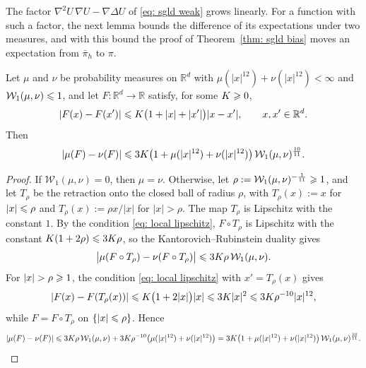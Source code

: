 The factor $\nabla^2 U\, \nabla U - \nabla \Delta U$ of \eqref{eq: sgld weak} grows linearly. For a function with such a factor, the next lemma bounds the difference of its expectations under two measures, and with this bound the proof of Theorem~\ref{thm: sgld bias} moves an expectation from $\bar\pi_h$ to $\pi$.

\begin{lemma}
\label{lem: local lipschitz}
    Let $\mu$ and $\nu$ be probability measures on $\mathbb R^d$ with $\mu(|x|^{12}) + \nu(|x|^{12}) < \infty$ and $\mathcal W_1(\mu, \nu) \leqslant 1$, and let $F : \mathbb R^d \to \mathbb R$ satisfy, for some $K \geqslant 0$,
    \begin{equation}
        |F(x) - F(x')| \leqslant K \bigl( 1 + |x| + |x'| \bigr) |x - x'| , \qquad x, x' \in \mathbb R^d .
        \label{eq: local lipschitz}
    \end{equation}
    Then
    \begin{equation*}
        |\mu(F) - \nu(F)| \leqslant 3 K \bigl( 1 + \mu(|x|^{12}) + \nu(|x|^{12}) \bigr)\, \mathcal W_1(\mu, \nu)^{\frac{10}{11}} .
    \end{equation*}
\end{lemma}

\begin{proof}
    If $\mathcal W_1(\mu,\nu) = 0$, then $\mu = \nu$. Otherwise, let $\rho := \mathcal W_1(\mu,\nu)^{-\frac1{11}} \geqslant 1$, and let $T_\rho$ be the retraction onto the closed ball of radius $\rho$, with $T_\rho(x) := x$ for $|x| \leqslant \rho$ and $T_\rho(x) := \rho x / |x|$ for $|x| > \rho$. The map $T_\rho$ is Lipschitz with the constant $1$. By the condition \eqref{eq: local lipschitz}, $F \circ T_\rho$ is Lipschitz with the constant $K(1 + 2\rho) \leqslant 3K\rho$, so the Kantorovich--Rubinstein duality gives
    \begin{equation*}
        \bigl| \mu(F \circ T_\rho) - \nu(F \circ T_\rho) \bigr| \leqslant 3 K \rho\, \mathcal W_1(\mu,\nu) .
    \end{equation*}
    For $|x| > \rho \geqslant 1$, the condition \eqref{eq: local lipschitz} with $x' = T_\rho(x)$ gives
    \begin{equation*}
        |F(x) - F(T_\rho(x))| \leqslant K \bigl( 1 + 2|x| \bigr) |x| \leqslant 3 K |x|^2 \leqslant 3 K \rho^{-10} |x|^{12} ,
    \end{equation*}
    while $F = F \circ T_\rho$ on $\{|x| \leqslant \rho\}$. Hence
    \begin{equation*}
        |\mu(F) - \nu(F)| \leqslant 3 K \rho\, \mathcal W_1(\mu,\nu) + 3 K \rho^{-10} \bigl( \mu(|x|^{12}) + \nu(|x|^{12}) \bigr) = 3 K \bigl( 1 + \mu(|x|^{12}) + \nu(|x|^{12}) \bigr)\, \mathcal W_1(\mu,\nu)^{\frac{10}{11}} .
    \end{equation*}
\end{proof}

